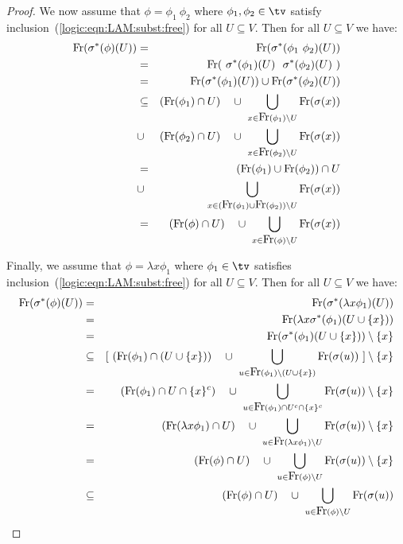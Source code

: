 \begin{proof}
We now assume that $\phi=\phi_{1}\ \phi_{2}$ where $\phi_{1}, \phi_{2}\in\tv$ satisfy 
inclusion~(\ref{logic:eqn:LAM:subst:free}) for all $U\subseteq V$. Then for all
$U\subseteq V$ we have:
    \begin{eqnarray*}
        \free(\sigma^{*}(\phi)(U))
        &=&\free(\sigma^{*}(\phi_{1}\ \phi_{2})(U))\\
        &=&\free(\ \sigma^{*}(\phi_{1})(U)\ \ \sigma^{*}(\phi_{2})(U)\ )\\
        &=&\free(\sigma^{*}(\phi_{1})(U))\cup\free(\sigma^{*}(\phi_{2})(U))\\
        &\subseteq&(\free(\phi_{1})\cap U)\ \ \ \cup\ 
            \bigcup_{x\in\free(\phi_{1})\setminus U} \free(\sigma(x))\\
        &\cup&(\free(\phi_{2})\cap U)\ \ \ \cup\ 
            \bigcup_{x\in\free(\phi_{2})\setminus U} \free(\sigma(x))\\
        &=&(\free(\phi_{1})\cup\free(\phi_{2}))\cap U\\
        &\cup&\bigcup_{x\in(\free(\phi_{1})\cup\free(\phi_{2}))\setminus U}
            \free(\sigma(x))\\
        &=&(\free(\phi)\cap U)\ \ \ \cup\ \bigcup_{x\in\free(\phi)\setminus U}
            \free(\sigma(x))
    \end{eqnarray*}

Finally, we assume that $\phi=\lambda x\phi_{1}$ where $\phi_{1}\in\tv$ satisfies
inclusion~(\ref{logic:eqn:LAM:subst:free}) for all $U\subseteq V$. Then for all
$U\subseteq V$ we have:
    \begin{eqnarray*}
        \free(\sigma^{*}(\phi)(U))
        &=&\free(\sigma^{*}(\lambda x\phi_{1})(U))\\
        &=&\free(\lambda x\sigma^{*}(\phi_{1})(U\cup\{x\}))\\
        &=&\free(\sigma^{*}(\phi_{1})(U\cup\{x\}))\setminus\{x\}\\
        &\subseteq& [\ (\free(\phi_{1})\cap(U\cup\{x\}))\ \ \ \cup\ 
            \bigcup_{u\in\free(\phi_{1})\setminus(U\cup\{x\})}\free(\sigma(u))
             \ ]\setminus\{x\}\\
        &=&(\free(\phi_{1})\cap U\cap \{x\}^{c})\ \ \ \cup\ 
            \bigcup_{u\in\free(\phi_{1})\cap U^{c}\cap\{x\}^{c}}
            \free(\sigma(u))\setminus\{x\}\\
        &=&(\free(\lambda x\phi_{1})\cap U)\ \ \ \cup\ 
            \bigcup_{u\in\free(\lambda x\phi_{1})\setminus U}
            \free(\sigma(u))\setminus\{x\}\\
        &=&(\free(\phi)\cap U)\ \ \ \cup\ \bigcup_{u\in\free(\phi)\setminus U} 
            \free(\sigma(u))\setminus\{x\}\\
        &\subseteq&(\free(\phi)\cap U)\ \ \ \cup\ \bigcup_{u\in\free(\phi)\setminus U} 
            \free(\sigma(u))
    \end{eqnarray*}
\end{proof}




